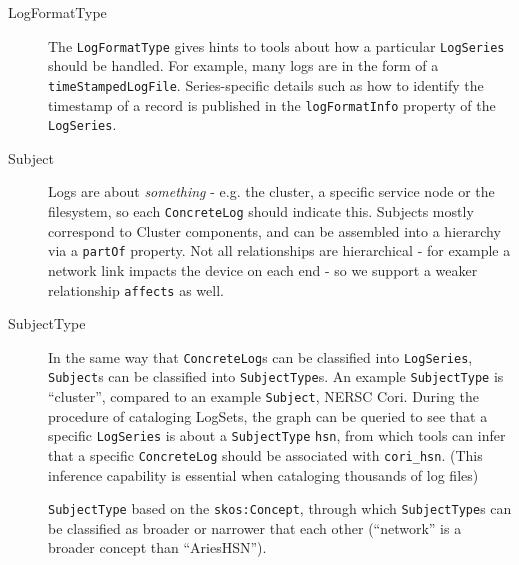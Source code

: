 \begin{description}
\item[LogFormatType] \hfill

The \texttt{LogFormatType} gives hints to tools about how a particular
\texttt{LogSeries} should be handled. For example, many logs are in the
form of a \texttt{timeStampedLogFile}. Series-specific details such 
as how to identify the timestamp of a record is published in the 
\texttt{logFormatInfo} property of the \texttt{LogSeries}.
 
\item[Subject] \hfill

Logs are about \emph{something} - e.g. the cluster, a specific service
node or the filesystem, so each \texttt{ConcreteLog} should indicate
this. Subjects mostly correspond to Cluster components, and can be 
assembled into a hierarchy via a \texttt{partOf} property. Not all 
relationships are hierarchical - for example a network link impacts
the device on each end - so we support a weaker relationship 
\texttt{affects} as well.

\item[SubjectType] \hfill

In the same way that \texttt{ConcreteLog}s can be classified into 
\texttt{LogSeries}, \texttt{Subject}s can be classified into 
\texttt{SubjectType}s. An example \texttt{SubjectType} is ``cluster'',
compared to an example \texttt{Subject}, NERSC Cori. During the
procedure of cataloging LogSets, the graph can be queried to see that
a specific \texttt{LogSeries} is about a \texttt{SubjectType} 
\texttt{hsn}, from which tools can infer that a specific 
\texttt{ConcreteLog} should be associated with \texttt{cori\_hsn}.
(This inference capability is essential when cataloging thousands of 
log files)

\texttt{SubjectType} based on the \texttt{skos:Concept}, through 
which \texttt{SubjectType}s can be classified as broader or narrower
that each other (``network'' is a broader concept than ``AriesHSN'').

\end{description}






